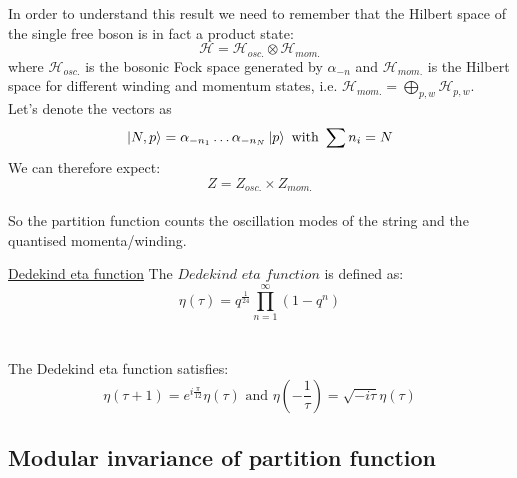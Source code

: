 \documentclass[11pt,aspectratio=169]{beamer}
\begin{document}
\begin{frame}
	In order to understand this result we need to remember that the Hilbert space of the single free boson is in fact a product state:
	\begin{equation}
		\mathcal{H} = \mathcal{H}_{osc.} \otimes \mathcal{H}_{mom.}
	\end{equation}
	where $\mathcal{H}_{osc.}$ is the bosonic Fock space generated by $\alpha_{-n}$ and $\mathcal{H}_{mom.}$ is the Hilbert space for different winding and momentum states, 
	i.e. $\mathcal{H}_{mom.} = \bigoplus_{p, w} \mathcal{H}_{p, w}$. 
	\\
	Let's denote the vectors as 
	\begin{equation}
		\ket{N,p} = \alpha_{-n_1} \dots \alpha_{-n_N} \ket{p} \textrm{ with } \sum n_i = N
	\end{equation}
	We can therefore expect:
	\begin{equation}
		Z = Z_{osc.} \times Z_{mom.}
	\end{equation}
	\\
	So the partition function counts the oscillation modes of the string and the quantised momenta/winding.
\end{frame}

\begin{frame}{\underline{Dedekind eta function}}
	The $\textit{Dedekind eta function}$ is defined as:
	\begin{equation}
		\eta(\tau) = q^{\frac{1}{24}}\prod_{n=1}^{\infty}(1 - q^n)
	\end{equation}
	\\~\\
	The Dedekind eta function satisfies:
	\begin{equation}
		\eta(\tau + 1) = e^{i\frac{\pi}{12}} \eta(\tau) \textrm{ and } \eta(-\frac{1}{\tau}) = \sqrt{-i\tau}\eta(\tau)
	\end{equation}
	
\end{frame}

\subsection{Modular invariance of partition function}
\end{document}

